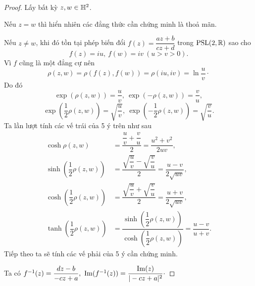 \begin{proof}
    Lấy bất kỳ $z,w \in \mathbb{H}^2$.

    Nếu $z = w$ thì hiển nhiên các đẳng thức cần chứng minh là thoả mãn.
    
    Nếu $z \neq w$, khi đó tồn tại phép biến đổi $f(z) = \dfrac{az+b}{cz+d}$ trong $\operatorname{PSL}(2,\mathbb{R})$ sao cho 
        \[f(z) = iu,~f(w)=iv~(u>v>0).\]
    Vì $f$ cũng là một đẳng cự nên \[\rho(z,w) = \rho(f(z),f(w)) = \rho(iu,iv) = \ln{\dfrac{u}{v}}\cdot\]
    Do đó
    \[\exp{(\rho(z,w))} =  \dfrac{u}{v},~\exp{(-\rho(z,w))} = \dfrac{v}{u},\]
    \[\exp{\left(\dfrac{1}{2}\rho(z,w)\right)} = \sqrt{\dfrac{u}{v}},~\exp{\left(-\dfrac{1}{2}\rho(z,w)\right)}  = \sqrt{\dfrac{v}{u}}.\]
    Ta lần lượt tính các vế trái của 5 ý trên như sau
    \begin{align*}
         \cosh\rho(z,w) &= \dfrac{\dfrac{u}{v}+\dfrac{v}{u}}{2} = \dfrac{u^2+v^2}{2uv},\\
         \sinh\left(\dfrac{1}{2}\rho(z,w)\right) &= \dfrac{\sqrt{\dfrac{u}{v}}-\sqrt{\dfrac{v}{u}}}{2} = \dfrac{u-v}{2\sqrt{uv}},\\
         \cosh\left(\dfrac{1}{2}\rho(z,w)\right) &= \dfrac{\sqrt{\dfrac{u}{v}}+\sqrt{\dfrac{v}{u}}}{2} = \dfrac{u+v}{2\sqrt{uv}},\\
         \tanh\left(\dfrac{1}{2}\rho(z,w)\right) & = \dfrac{\sinh\left(\dfrac{1}{2}\rho(z,w)\right)}{\cosh\left(\dfrac{1}{2}\rho(z,w)\right)} = \dfrac{u-v}{u+v}.
    \end{align*}
    Tiếp theo ta sẽ tính các vế phải của 5 ý cần chứng minh. 
    
    Ta có $f^{-1}(z) = \dfrac{dz-b}{-cz+a},~\operatorname{Im}(f^{-1}(z)) = \dfrac{\operatorname{Im}(z)}{|-cz+a|^2}\cdot$
    

\end{proof}
